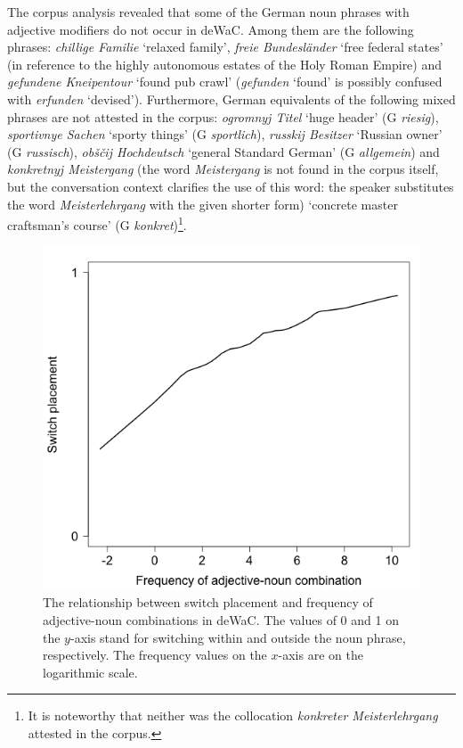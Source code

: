 The corpus analysis revealed that some of the German noun phrases with adjective modifiers do not occur in deWaC. Among them are the following phrases: \textit{chillige Familie} `relaxed family', \textit{freie Bundesländer} `free federal states' (in reference to the highly autonomous estates of the Holy Roman Empire) and \textit{gefundene Kneipentour} `found pub crawl' (\textit{gefunden} `found' is possibly confused with \textit{erfunden} `devised'). Furthermore, German equivalents of the following mixed phrases are not attested in the corpus: \textit{ogromnyj Titel} `huge header' (G \textit{riesig}), \textit{sportivnye Sachen} `sporty things' (G \textit{sportlich}), \textit{russkij Besitzer} `Russian owner' (G \textit{russisch}), \textit{obščij Hochdeutsch} `general Standard German' (G \textit{allgemein}) and \textit{konkretnyj Meistergang} (the word \textit{Meistergang} is not found in the corpus itself, but the conversation context clarifies the use of this word: the speaker substitutes the word \textit{Meisterlehrgang} with the given shorter form) `concrete master craftsman's course' (G \textit{konkret})\footnote{It is noteworthy that neither was the collocation \textit{konkreter Meisterlehrgang} attested in the corpus.}.

\begin{figure}
    	\includegraphics[scale=0.5]{figures/4-Fr_co-occ.png}
	\caption{The relationship between switch placement and frequency of adjective-noun combinations in deWaC. The values of 0 and 1 on the $y$-axis stand for switching within and outside the noun phrase, respectively. The frequency values on the $x$-axis are on the logarithmic scale.\label{fig:4:co-occ}}
\end{figure}

